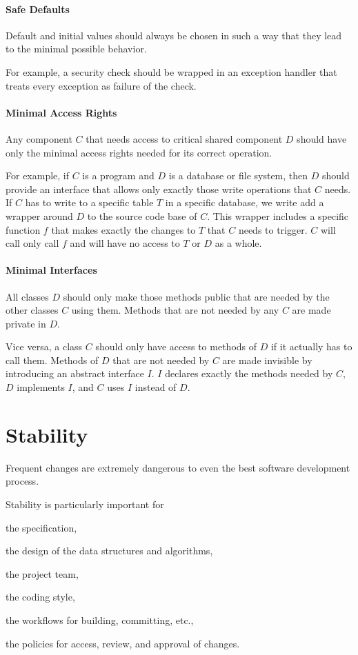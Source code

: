 \paragraph{Safe Defaults}
Default and initial values should always be chosen in such a way that they lead to the minimal possible behavior.

For example, a security check should be wrapped in an exception handler that treats every exception as failure of the check.

\paragraph{Minimal Access Rights}
Any component $C$ that needs access to critical shared component $D$ should have only the minimal access rights needed for its correct operation.

For example, if $C$ is a program and $D$ is a database or file system, then $D$ should provide an interface that allows only exactly those write operations that $C$ needs.
If $C$ has to write to a specific table $T$ in a specific database, we write add a wrapper around $D$ to the source code base of $C$.
This wrapper includes a specific function $f$ that makes exactly the changes to $T$ that $C$ needs to trigger.
$C$ will call only call $f$ and will have no access to $T$ or $D$ as a whole.

\paragraph{Minimal Interfaces}
All classes $D$ should only make those methods public that are needed by the other classes $C$ using them.
Methods that are not needed by any $C$ are made private in $D$.

Vice versa, a class $C$ should only have access to methods of $D$ if it actually has to call them.
Methods of $D$ that are not needed by $C$ are made invisible by introducing an abstract interface $I$.
$I$ declares exactly the methods needed by $C$, $D$ implements $I$, and $C$ uses $I$ instead of $D$.

\section{Stability}

Frequent changes are extremely dangerous to even the best software development process.

Stability is particularly important for
\begin{compactitem}
  \item the specification,
  \item the design of the data structures and algorithms,
  \item the project team,
  \item the coding style,
  \item the workflows for building, committing, etc.,
  \item the policies for access, review, and approval of changes.
\end{compactitem}


